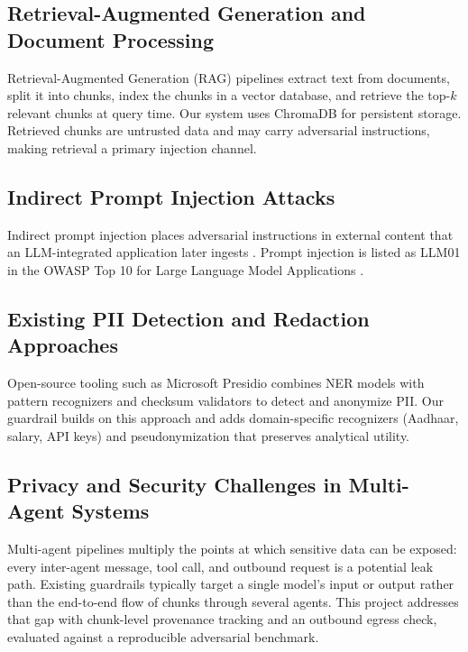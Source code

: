 \documentclass[11pt,a4paper]{article}
\begin{document}
\subsection{Retrieval-Augmented Generation and Document Processing}
Retrieval-Augmented Generation (RAG) pipelines extract text from documents, split it into chunks, index the chunks in a vector database, and retrieve the top-$k$ relevant chunks at query time. Our system uses ChromaDB \cite{chromadb2023} for persistent storage. Retrieved chunks are untrusted data and may carry adversarial instructions, making retrieval a primary injection channel.

\subsection{Indirect Prompt Injection Attacks}
Indirect prompt injection places adversarial instructions in external content that an LLM-integrated application later ingests \cite{perez2022ignore,greshake2023not}. Prompt injection is listed as LLM01 in the OWASP Top 10 for Large Language Model Applications \cite{owasp2023llm}.

\subsection{Existing PII Detection and Redaction Approaches}
Open-source tooling such as Microsoft Presidio \cite{presidio2023} combines NER models with pattern recognizers and checksum validators to detect and anonymize PII. Our guardrail builds on this approach and adds domain-specific recognizers (Aadhaar, salary, API keys) and pseudonymization that preserves analytical utility.

\subsection{Privacy and Security Challenges in Multi-Agent Systems}
Multi-agent pipelines multiply the points at which sensitive data can be exposed: every inter-agent message, tool call, and outbound request is a potential leak path. Existing guardrails typically target a single model's input or output rather than the end-to-end flow of chunks through several agents. This project addresses that gap with chunk-level provenance tracking and an outbound egress check, evaluated against a reproducible adversarial benchmark.
\end{document}
